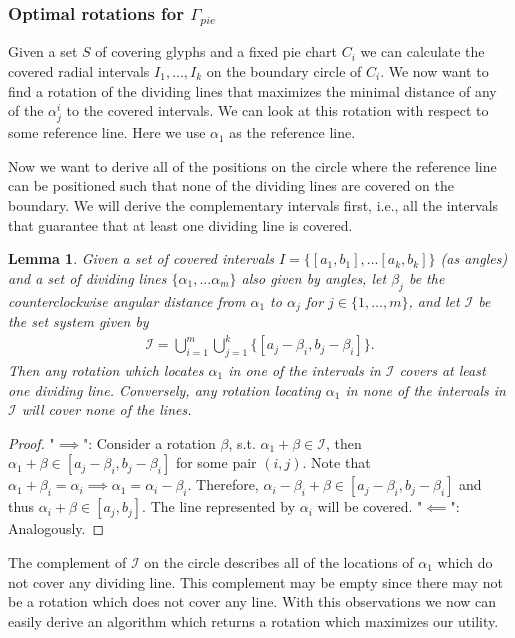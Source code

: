 \documentclass[a4paper,11pt]{article}
\newtheorem{lemma}{Lemma}
\begin{document}
\subsubsection{Optimal rotations for $\Gamma_{pie}$}

Given a set $S$ of covering glyphs and a fixed pie chart $C_i$ we can calculate the covered radial intervals $I_1,...,I_k$ on the boundary circle of $C_i$. We now want to find a rotation of the dividing lines that maximizes the minimal distance of any of the $\alpha^i_j$ to the covered intervals. We can look at this rotation with respect to some reference line. Here we use $\alpha_1$ as the reference line.

Now we want to derive all of the positions on the circle where the reference line can be positioned such that none of the dividing lines are covered on the boundary. We will derive the complementary intervals first, i.e., all the intervals that guarantee that at least one dividing line is covered.

\begin{lemma}
  Given a set of covered intervals $I=\{[a_1,b_1],...[a_k,b_k]\}$ (as angles) and a set of dividing lines $\{\alpha_1,...\alpha_m\}$ also given by angles, let $\beta_j$ be the counterclockwise angular distance from $\alpha_1$ to $\alpha_j$ for $j\in\{1,\dots,m\}$, and let $\mathcal{I}$ be the set system given by
  \begin{align*}
    \mathcal{I}=\bigcup_{i=1}^m    \bigcup_{j=1}^k \{ [a_j-\beta_i,b_j-\beta_i]   \}.
  \end{align*}
  Then any rotation which locates $\alpha_1$ in one of the intervals in $\mathcal{I}$ covers at least one dividing line. Conversely, any rotation locating $\alpha_1$ in none of the intervals in $\mathcal{I}$ will cover none of the lines.
\end{lemma}

\begin{proof}
  "$\implies$": Consider a rotation $\beta$, s.t. $\alpha_1 + \beta \in \mathcal{I}$, then $\alpha_1 + \beta \in [a_j - \beta_i, b_j-\beta_i]$ for some pair $(i,j)$. Note that $\alpha_1 + \beta_i = \alpha_i \implies \alpha_1 = \alpha_i - \beta_i$. Therefore, $\alpha_i-\beta_i+\beta\in[a_j-\beta_i, b_j-\beta_i]$ and thus $\alpha_i+\beta\in[a_j, b_j]$. The line represented by $\alpha_i$ will be covered.
  "$\impliedby$": Analogously.
\end{proof}

The complement of $\mathcal{I}$ on the circle describes all of the locations of $\alpha_1$ which do not cover any dividing line. This complement may be empty since there may not be a rotation which does not cover any line. With this observations we now can easily derive an algorithm which returns a rotation which maximizes our utility.
\end{document}
